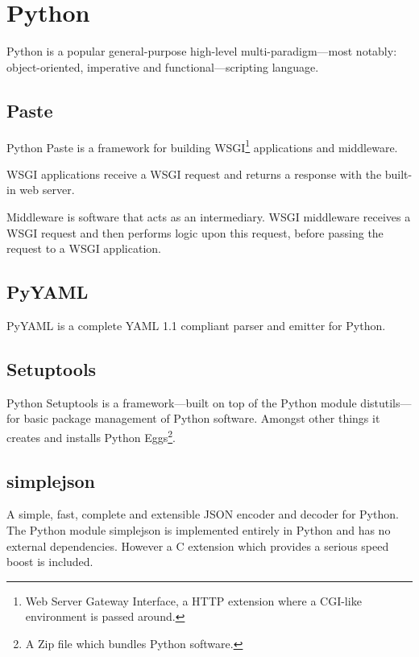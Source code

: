 \documentclass[a4paper,10pt]{book}
\begin{document}
\section{Python}

Python is a popular general-purpose high-level multi-paradigm---most
notably: object-oriented, imperative and functional---scripting language.


\subsection{Paste}

Python Paste is a framework for building WSGI\footnote{Web Server Gateway
Interface, a HTTP extension where a CGI-like environment is passed around.}
applications and middleware.

WSGI applications receive a WSGI request and returns a response with the
built-in web server.

Middleware is software that acts as an intermediary. WSGI middleware
receives a WSGI request and then performs logic upon this request, before
passing the request to a WSGI application.


\subsection{PyYAML}

PyYAML is a complete YAML 1.1 compliant parser and emitter for Python.


\subsection{Setuptools}

Python Setuptools is a framework---built on top of the Python module
distutils---for basic package management of Python software. Amongst other
things it creates and installs Python Eggs\footnote{A Zip file which
bundles Python software.}.


\subsection{simplejson}

A simple, fast, complete and extensible JSON encoder and decoder for
Python. The Python module simplejson is implemented entirely in Python and
has no external dependencies. However a C extension which provides a
serious speed boost is included.
\end{document}

